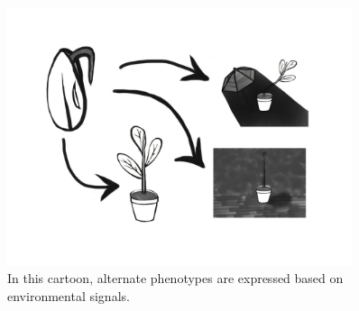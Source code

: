 \begin{figure}
\begin{columns}
\begin{column}{0.65\textwidth}
\includegraphics[width=\textwidth,trim={2cm 11cm 5cm 7cm},clip]{img/plant_developmental_perturbation}
\end{column}
\begin{column}{0.3\textwidth}
  \caption{In this cartoon, alternate phenotypes are expressed based on environmental signals.}
  \end{column}
  \begin{column}{0.05\textwidth}
  \end{column}
  \end{columns}
  \label{fig:plant_developmental_perturbation}
\end{figure}
